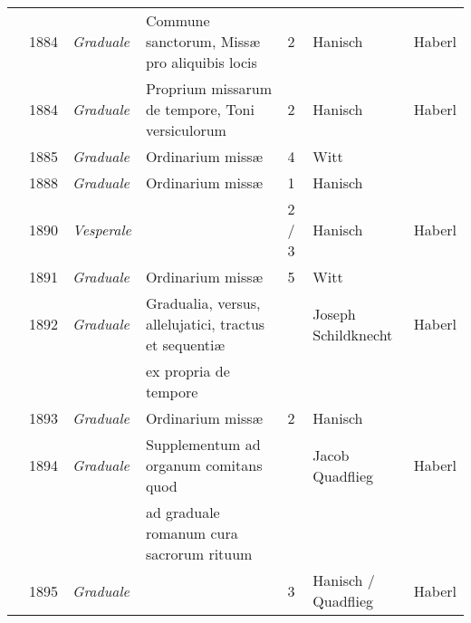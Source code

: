 \begin{landscape}
\begin{table}[ht]
\begin{tabular}{@{}rllllll@{}}
                           & 1884 & \textit{Graduale}  & Commune sanctorum, Missæ pro aliquibis locis           & 2       & Hanisch                      & Haberl             \\
                           & 1884 & \textit{Graduale}  & Proprium missarum de tempore, Toni versiculorum        & 2       & Hanisch                      & Haberl             \\
                           & 1885 & \textit{Graduale}  & Ordinarium missæ                                       & 4       & Witt                         &                    \\
\covid{}                    & 1888 & \textit{Graduale}  & Ordinarium missæ                                       & 1       & Hanisch                      &                    \\
                           & 1890 & \textit{Vesperale} &                                                        & 2 / 3   & Hanisch                      & Haberl             \\
\covid{}                    & 1891 & \textit{Graduale}  & Ordinarium missæ                                       & 5       & Witt\dagger{}                &                    \\
                           & 1892 & \textit{Graduale}  & Gradualia, versus, allelujatici, tractus et sequentiæ  & \star{} & Joseph Schildknecht          & Haberl             \\
\multicolumn{1}{l}{}       &      & \textit{}          & \hspace*{2em} ex propria de tempore                    &         &                              &                    \\
\covid{}                    & 1893 & \textit{Graduale}  & Ordinarium missæ                                       & 2       & Hanisch\dagger{}                      &                    \\
                           & 1894 & \textit{Graduale}  & Supplementum ad organum comitans quod                  & \star{} & Jacob Quadflieg              & Haberl             \\
\multicolumn{1}{l}{}       &      & \textit{}          & \hspace*{2em} ad graduale romanum cura sacrorum rituum &         &                              &                    \\
\covid{}                    & 1895 & \textit{Graduale}  &                                                        & 3       & Hanisch\dagger{} / Quadflieg & Haberl             \\

\end{tabular}
\end{table}
\end{landscape}
